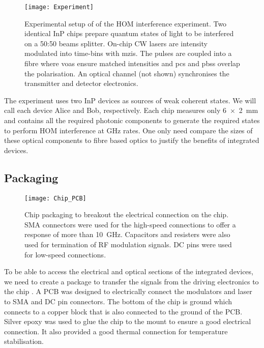 \begin{figure}[tbp]
	\centering
	\texttt{[image: Experiment]}
	\caption[Hon-Ou-Mandel interference experimental setup]{Experimental setup of of the \ac{HOM} interference experiment. Two identical \ac{InP} chips prepare quantum states of light to be interfered on a {50:50} beams splitter. On-chip \ac{CW} lasers are intensity modulated into time-bins with \acp{mzi}. The pulses are coupled into a fibre where \acp{voa} ensure matched intensities and \acp{pc} and \acp{pbs} overlap the polarisation. An optical channel (not shown) synchronises the transmitter and detector electronics.}
	\label{fig:hom_experiment}
\end{figure}

The experiment uses two \ac{InP} devices as sources of weak coherent states. We will call each device Alice and Bob, respectively. Each chip measures only \SI[product-units=power]{6x2}{mm} and contains all the required photonic components to generate the required states to perform \ac{HOM} interference at GHz rates. One only need compare the sizes of these optical components to fibre based optics to justify the benefits of integrated devices.

\subsection{Packaging}

\begin{figure}[tbp]
	\centering
	\texttt{[image: Chip\_PCB]}
	\caption[Transmitter PCB package]{Chip packaging to breakout the electrical connection on the chip. SMA connectors were used for the high-speed connections to offer a response of more than \SI{10}{\GHz}. Capacitors and resisters were also used for termination of RF modulation signals. DC pins were used for low-speed connections.}
	\label{fig:chip_pcb}
\end{figure}

To be able to access the electrical and optical sections of the integrated devices, we need to create a package to transfer the signals from the driving electronics to the chip . A PCB was designed to electrically connect the modulators and laser to SMA and DC pin connectors. The bottom of the chip is ground which connects to a copper block that is also connected to the ground of the PCB. Silver epoxy was used to glue the chip to the mount to ensure a good electrical connection. It also provided a good thermal connection for temperature stabilisation.

